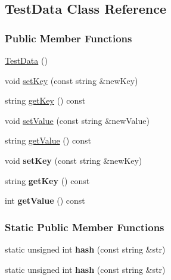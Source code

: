 \hypertarget{class_test_data}{}\subsection{Test\+Data Class Reference}
\label{class_test_data}
\subsubsection*{Public Member Functions}
\begin{DoxyCompactItemize}
\item 
\hyperlink{class_test_data_aa4a3dd519ba3a3ae02956b627d42d123}{Test\+Data} ()
\item 
void \hyperlink{class_test_data_a72cb0d5febcf77e8a6dd494fa6dff411}{set\+Key} (const string \&new\+Key)
\item 
string \hyperlink{class_test_data_ae20d0a4c5fba891d728c68ac4ec79654}{get\+Key} () const 
\item 
void \hyperlink{class_test_data_ac7fe71dc8c3eda2242e443d22523e286}{set\+Value} (const string \&new\+Value)
\item 
string \hyperlink{class_test_data_af33e667b6962f8a351f7a660a1a24c5e}{get\+Value} () const 
\item 
void {\bfseries set\+Key} (const string \&new\+Key)\hypertarget{class_test_data_a72cb0d5febcf77e8a6dd494fa6dff411}{}\label{class_test_data_a72cb0d5febcf77e8a6dd494fa6dff411}

\item 
string {\bfseries get\+Key} () const \hypertarget{class_test_data_ae20d0a4c5fba891d728c68ac4ec79654}{}\label{class_test_data_ae20d0a4c5fba891d728c68ac4ec79654}

\item 
int {\bfseries get\+Value} () const \hypertarget{class_test_data_af33e667b6962f8a351f7a660a1a24c5e}{}\label{class_test_data_af33e667b6962f8a351f7a660a1a24c5e}

\end{DoxyCompactItemize}
\subsubsection*{Static Public Member Functions}
\begin{DoxyCompactItemize}
\item 
static unsigned int {\bfseries hash} (const string \&str)\hypertarget{class_test_data_a55f0e2851aa330be9921303107982f98}{}\label{class_test_data_a55f0e2851aa330be9921303107982f98}

\item 
static unsigned int {\bfseries hash} (const string \&str)\hypertarget{class_test_data_ac38bf2161ad472cfa80703a87e7eda8a}{}\label{class_test_data_ac38bf2161ad472cfa80703a87e7eda8a}

\end{DoxyCompactItemize}
